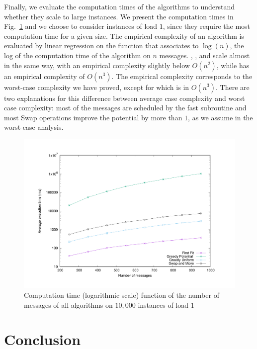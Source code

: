 \documentclass[pdflatex,sn-mathphys,iicol]{sn-jnl}%
\theoremstyle{thmstyleone}%
\theoremstyle{thmstyletwo}%
\theoremstyle{thmstylethree}%
\begin{document}
 
 \medskip
 Finally, we evaluate the computation times of the algorithms to understand whether they scale to large instances. We present the computation times in Fig.~\ref{fig:timelog} and we choose to consider instances of load $1$, since they require the most computation time for a given size. The empirical complexity of an algorithm is evaluated by
 linear regression on the function that associates to $\log(n)$, the log of the computation time of the algorithm on $n$ messages.  \firstfit, \greedyuniform, and \swapandmove scale almost in the same way, with an empirical complexity slightly below $O(n^2)$, while \greedypotential has an empirical complexity of $O(n^3)$. The empirical complexity corresponds to the worst-case complexity we have proved, except for \swapandmove which is in $O(n^3)$. There are two explanations for this difference between average case complexity and worst case complexity: most of the messages are scheduled by the fast \firstfit subroutine and most Swap operations improve the potential by more than $1$, as we assume in the worst-case analysis.

\begin{figure}
 \begin{center}
\includegraphics[scale=0.275]{log}
\end{center}
\caption{Computation time (logarithmic scale) function of the number of messages of all algorithms on $10,000$ instances of load $1$}
\label{fig:timelog}
\end{figure}



 
\section{Conclusion}
\end{document}
